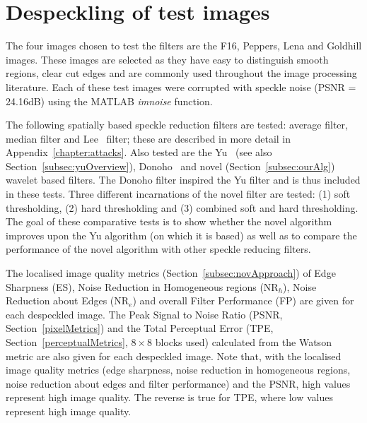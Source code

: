 \documentclass[12pt]{report}
\begin{document}
\section{Despeckling of test images}
The four images chosen to test the filters are the F16, Peppers, Lena and Goldhill images. These images are selected 
as they have easy to distinguish smooth regions, clear cut edges and are commonly used throughout the image processing 
literature. Each of these test images were corrupted with speckle noise (PSNR = 24.16dB) 
using the MATLAB \emph{imnoise} function.

The following spatially based speckle reduction filters are tested: average filter, median filter and Lee~\cite{lee80} filter;
these are described in more detail in Appendix~\ref{chapter:attacks}.
Also tested are the 
Yu~\cite{yu96} (see also Section~\ref{subsec:yuOverview}),
Donoho~\cite{don95} and
novel (Section~\ref{subsec:ourAlg}) 
wavelet based filters. 
The Donoho filter inspired the Yu filter and is thus included in these tests.
Three different incarnations of the novel filter are tested: (1) soft thresholding, (2) hard thresholding and (3)
combined soft and hard thresholding.
The goal of these comparative tests is to show whether the novel algorithm improves upon the Yu algorithm (on which it is based) as well
as to compare the performance of the novel algorithm with other speckle reducing filters.

The localised image quality metrics (Section~\ref{subsec:novApproach}) of 
Edge Sharpness (ES),  Noise Reduction in Homogeneous regions ($\mbox{NR}_{h}$), 
Noise Reduction about Edges ($\mbox{NR}_{e}$) and overall Filter Performance (FP) are given for each despeckled image. 
The Peak Signal to Noise Ratio (PSNR, Section~\ref{pixelMetrics}) and the 
Total Perceptual Error (TPE, Section~\ref{perceptualMetrics},
$8\times8$ blocks used) 
calculated from the Watson metric are also given for each despeckled image.
Note that, with the localised image quality metrics 
(edge sharpness, noise reduction in homogeneous regions, noise reduction about edges and filter performance)
and the PSNR, high values
represent high image quality. The reverse is true for TPE, where low values represent high image quality.
\end{document}

